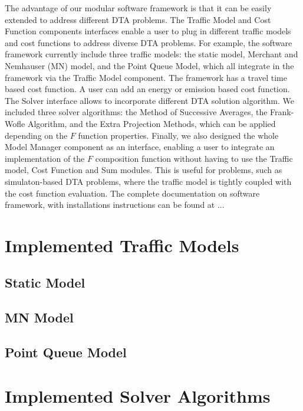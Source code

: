 \documentclass[conference]{IEEEtran}
\renewcommand{\:}{\mathrel{\coloneqq}}
\renewcommand{\=}{\ensuremath{\eqqcolon}}
\newcommand{\0}{\ensuremath{\boldsymbol{0}}}
\begin{document}
The advantage of our modular software framework is that it can be easily extended to address different DTA problems. The Traffic Model and Cost Function components interfaces enable a user to plug in different traffic models and cost functions to address diverse DTA problems. For example, the software framework currently include three traffic models: the static model, Merchant and Nemhauser (MN) model, and the Point Queue Model, which all integrate in the framework via the Traffic Model component. The framework has a travel time based cost function. A user can add an energy or emission based cost function. The Solver interface allows to incorporate different DTA solution algorithm. We included three solver algorithms: the Method of Successive Averages, the Frank-Wofle Algorithm, and the Extra Projection Methods, which can be applied depending on the $F$ function properties. Finally, we also designed the whole Model Manager component as an interface, enabling a user to integrate an implementation of the $F$ composition function without having to use the Traffic model, Cost Function and Sum modules. This is useful for problems, such as simulaton-based DTA problems, where the traffic model is tightly coupled with the cost function evaluation. The complete documentation on software framework, with installations instructions can be found at ...

\section{Implemented Traffic Models}
\subsection{Static Model}
\subsection{MN Model}
\subsection{Point Queue Model}

\section{Implemented Solver Algorithms}
\end{document}
